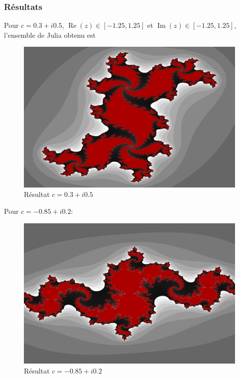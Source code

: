 \documentclass{article}
\theoremstyle{definition}
\begin{document}
\subsubsection{Résultats}

Pour \(c = 0.3 + i0.5\), \(\operatorname{Re}(z) \in
[-1.25, 1.25]\) et \(\operatorname{Im}(z) \in
[-1.25, 1.25]\), l'ensemble de Julia obtenu est

\begin{figure}[h]
    \centering
    \includegraphics[scale= 0.23]{images/0305}
    \caption{Résultat \(c = 0.3 + i0.5\)}
\end{figure}

Pour \(c = -0.85 + i0.2\):

\begin{figure}[h]
    \centering
    \includegraphics[scale= 0.23]{images/08502}
    \caption{Résultat \(c = -0.85 + i0.2\)}
\end{figure}
\end{document}

